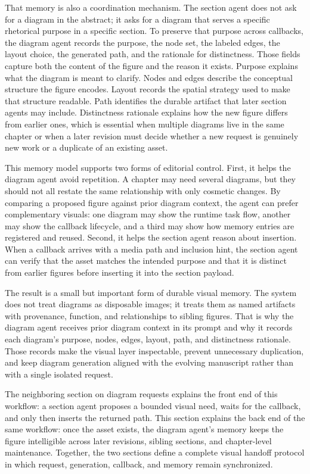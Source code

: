 \documentclass[11pt]{article}
\begin{document}
That memory is also a coordination mechanism. The section agent does not ask for a diagram in the abstract; it asks for a diagram that serves a specific rhetorical purpose in a specific section. To preserve that purpose across callbacks, the diagram agent records the purpose, the node set, the labeled edges, the layout choice, the generated path, and the rationale for distinctness. Those fields capture both the content of the figure and the reason it exists. Purpose explains what the diagram is meant to clarify. Nodes and edges describe the conceptual structure the figure encodes. Layout records the spatial strategy used to make that structure readable. Path identifies the durable artifact that later section agents may include. Distinctness rationale explains how the new figure differs from earlier ones, which is essential when multiple diagrams live in the same chapter or when a later revision must decide whether a new request is genuinely new work or a duplicate of an existing asset.

This memory model supports two forms of editorial control. First, it helps the diagram agent avoid repetition. A chapter may need several diagrams, but they should not all restate the same relationship with only cosmetic changes. By comparing a proposed figure against prior diagram context, the agent can prefer complementary visuals: one diagram may show the runtime task flow, another may show the callback lifecycle, and a third may show how memory entries are registered and reused. Second, it helps the section agent reason about insertion. When a callback arrives with a media path and inclusion hint, the section agent can verify that the asset matches the intended purpose and that it is distinct from earlier figures before inserting it into the section payload.

The result is a small but important form of durable visual memory. The system does not treat diagrams as disposable images; it treats them as named artifacts with provenance, function, and relationships to sibling figures. That is why the diagram agent receives prior diagram context in its prompt and why it records each diagram's purpose, nodes, edges, layout, path, and distinctness rationale. Those records make the visual layer inspectable, prevent unnecessary duplication, and keep diagram generation aligned with the evolving manuscript rather than with a single isolated request.

The neighboring section on diagram requests explains the front end of this workflow: a section agent proposes a bounded visual need, waits for the callback, and only then inserts the returned path. This section explains the back end of the same workflow: once the asset exists, the diagram agent's memory keeps the figure intelligible across later revisions, sibling sections, and chapter-level maintenance. Together, the two sections define a complete visual handoff protocol in which request, generation, callback, and memory remain synchronized.
\end{document}

